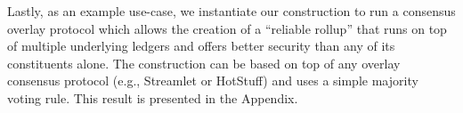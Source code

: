 \iflong
Lastly, as an example use-case, we instantiate our \rollerblade construction
to run a consensus overlay protocol which allows the creation of a ``reliable
rollup'' that runs on top of multiple underlying ledgers and offers better security
than any of its constituents alone. The construction can be based on top of any
overlay consensus protocol (e.g., Streamlet or HotStuff) and uses a simple
majority voting rule. This result is presented in the Appendix.
\fi


%
%
